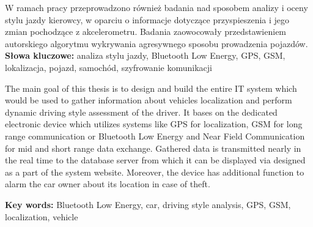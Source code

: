 \begin{singlespacing}
W ramach pracy przeprowadzono również badania nad sposobem analizy i oceny stylu jazdy kierowcy, w oparciu o informacje dotyczące przyspieszenia i jego zmian pochodzące z akcelerometru. Badania zaowocowały przedstawieniem autorskiego algorytmu wykrywania agresywnego sposobu prowadzenia pojazdów.\\

\textbf{Słowa kluczowe: }analiza stylu jazdy, Bluetooth Low Energy, GPS, GSM, lokalizacja, pojazd, samochód, szyfrowanie komunikacji

\end{singlespacing}

\clearpage
\thispagestyle{empty}
\clearpage
\thispagestyle{empty}




\begin{singlespacing}


The main goal of this thesis is to design and build the entire IT system which would be used to gather information about vehicles localization and perform dynamic driving style assessment of the driver. It bases on the dedicated electronic device which utilizes systems like GPS for localization, GSM for long range communication or Bluetooth Low Energy and Near Field Communication for mid and short range data exchange. Gathered data is transmitted nearly in the real time to the database server from which it can be displayed via designed as a part of the system website. Moreover, the device has additional function to alarm the car owner about its location in case of theft.

\flushbottom
\textbf{Key words: }Bluetooth Low Energy, car, driving style analysis, GPS, GSM, localization, vehicle
\end{singlespacing}
